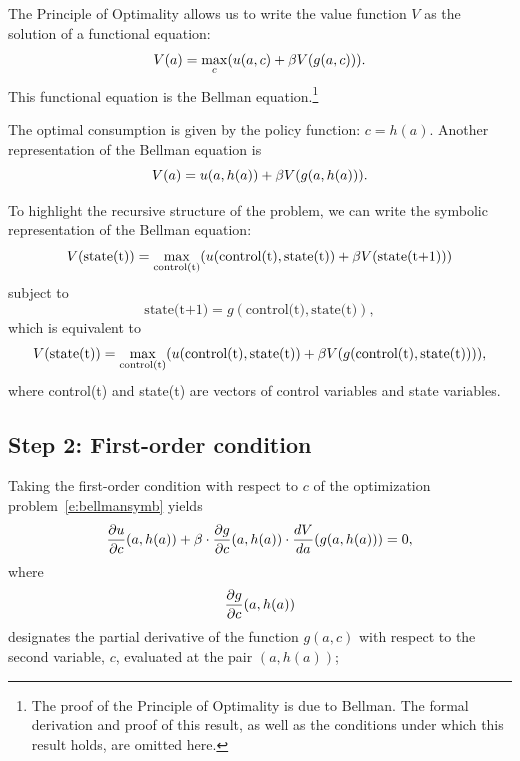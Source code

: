 \documentclass[letterpaper, 11pt, leqno]{article}
\begin{document}
The Principle of Optimality allows us to write the value function $V$ as the solution of a functional equation:
\begin{equation}
V(a)=\max[c]{u(a,c)+\b V(g(a,c))}.
\label{e:bellmansymb}\end{equation}
This functional equation is the Bellman equation.\footnote{The proof of the Principle of Optimality is due to Bellman. The formal derivation and proof of this result, as well as the conditions under which this result holds, are omitted here.} 

The optimal consumption is given by the policy function: $c=h(a)$. Another representation of the Bellman equation is 
\begin{equation}
V(a)=u(a,h(a))+\beta V(g(a,h(a))).
\label{e:bellmansymb2}\end{equation}

To highlight the recursive structure of the problem, we can write the symbolic representation of the Bellman equation:
\begin{equation*}
V(\text{state(t)}) = \max[\text{control(t)}]{u(\text{control(t)},\text{state(t)})+\b V(\text{state(t+1)})}
\end{equation*}
subject to
\begin{equation*}
\text{state(t+1)} = g(\text{control(t)},\text{state(t)}),
\end{equation*}
which is equivalent to
\begin{equation*}
V(\text{state(t)}) = \max[\text{control(t)}]{u(\text{control(t)},\text{state(t)})+\b V(g(\text{control(t)},\text{state(t)}))},
\end{equation*}
where control(t) and state(t) are vectors of control variables and state variables.

\subsection{Step 2: First-order condition}

Taking the first-order condition with respect to $c$ of the optimization problem~\eqref{e:bellmansymb} yields 
\begin{equation}
\pd{u}{c}(a,h(a))+\b \cdot \pd{g}{c}(a,h(a)) \cdot \od{V}{a}(g(a,h(a)))=0,
\label{e:focsymb}\end{equation}
where
\begin{equation*}
\pd{g}{c}(a,h(a))
\end{equation*}
designates the partial derivative of the function $g(a,c)$ with respect to the second variable, $c$, evaluated at the pair $(a,h(a))$;
\end{document}

